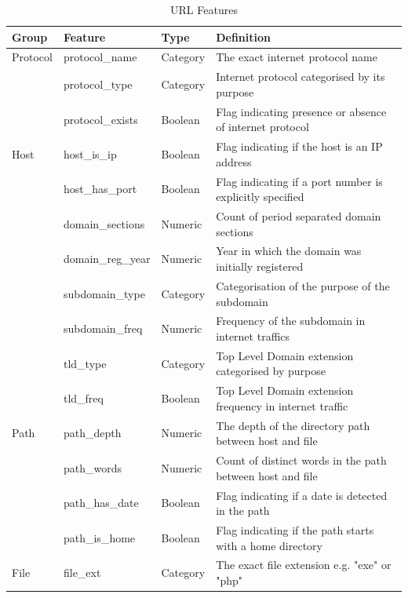 \documentclass[sigconf]{acmart}
\begin{document}
\begin{table}
\caption{URL Features}
\label{tab:features}
\begin{tabular}{|l|l|l|l|}
\toprule
Group         &Feature              &Type        &Definition  \\
\midrule
Protocol      &protocol\_name         &Category    &The exact internet protocol name    \\
              &protocol\_type         &Category    &Internet protocol categorised by its purpose    \\
              &protocol\_exists       &Boolean     &Flag indicating presence or absence of internet protocol   \\
\midrule
Host          &host\_is\_ip           &Boolean     &Flag indicating if the host is an IP address    \\
              &host\_has\_port        &Boolean     &Flag indicating if a port number is explicitly specified    \\
              &domain\_sections       &Numeric     &Count of period separated domain sections    \\
              &domain\_reg\_year      &Numeric     &Year in which the domain was initially registered    \\
              &subdomain\_type        &Category    &Categorisation of the purpose of the subdomain \\
              &subdomain\_freq        &Numeric     &Frequency of the subdomain in internet traffics    \\
              &tld\_type              &Category    &Top Level Domain extension categorised by purpose    \\
              &tld\_freq              &Boolean     &Top Level Domain extension frequency in internet traffic   \\
\midrule
Path          &path\_depth            &Numeric     &The depth of the directory path between host and file   \\
              &path\_words            &Numeric     &Count of distinct words in the path between host and file   \\
              &path\_has\_date         &Boolean     &Flag indicating if a date is detected in the path  \\
              &path\_is\_home          &Boolean     &Flag indicating if the path starts with a home directory    \\
\midrule 
File          &file\_ext              &Category    &The exact file extension e.g. "exe" or "php"    \\

\end{tabular}
\end{table}
\end{document}
